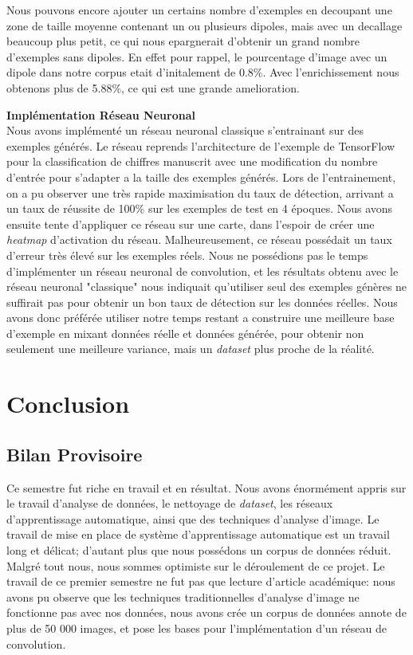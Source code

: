 \documentclass[a4paper, 12pt, titlepage, oneside, french]{article}
\begin{document}
Nous pouvons encore ajouter un certains nombre d'exemples en decoupant une zone de taille moyenne contenant un ou plusieurs dipoles, mais avec un decallage beaucoup plus petit, ce qui nous epargnerait d'obtenir un grand nombre d'exemples sans dipoles. En effet pour rappel, le pourcentage d'image avec un dipole dans notre corpus etait d'initalement de 0.8\%. Avec l'enrichissement nous obtenons plus de 5.88\%, ce qui est une grande amelioration.

	\textbf{Implémentation Réseau Neuronal}\\
	\indent Nous avons implémenté un réseau neuronal classique s'entrainant sur des exemples générés. Le réseau reprends l'architecture de l'exemple de TensorFlow pour la classification de chiffres manuscrit avec une modification du nombre d'entrée pour s'adapter a la taille des exemples générés. Lors de l'entrainement, on a pu observer une très rapide maximisation du taux de détection, arrivant a un taux de réussite de 100\% sur les exemples de test en 4 époques. Nous avons ensuite tente d'appliquer ce réseau sur une carte, dans l'espoir de créer une \textit{heatmap} d'activation du réseau. Malheureusement, ce réseau possédait un taux d'erreur très élevé sur les exemples réels. Nous ne possédions pas le temps d'implémenter un réseau neuronal de convolution, et les résultats obtenu avec le réseau neuronal "classique" nous indiquait qu'utiliser seul des exemples génères ne suffirait pas pour obtenir un bon taux de détection sur les données réelles. Nous avons donc préférée utiliser notre temps restant a construire une meilleure base d'exemple en mixant données réelle et données générée, pour obtenir non seulement une meilleure variance, mais un \textit{dataset} plus proche de la réalité.
\newpage
\section{Conclusion}
	\subsection{Bilan Provisoire} %
	Ce semestre fut riche en travail et en résultat. Nous avons énormément appris sur le travail d'analyse de données, le nettoyage de \textit{dataset}, les réseaux d'apprentissage automatique, ainsi que des techniques d'analyse d'image. Le travail de mise en place de système d'apprentissage automatique est un travail long et délicat; d'autant plus que nous possédons un corpus de données réduit. Malgré tout nous, nous sommes optimiste sur le déroulement de ce projet. Le travail de ce premier semestre ne fut pas que lecture d'article académique: nous avons pu observe que les techniques traditionnelles d'analyse d'image ne fonctionne pas avec nos données, nous avons crée un corpus de données annote de plus de 50 000 images, et pose les bases pour l'implémentation d'un réseau de convolution.
\end{document}
